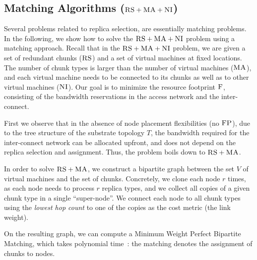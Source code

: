 \documentclass[9pt,twocolumn]{scrartcl}
\newcommand{\Capacity}{\ensuremath{\textsc{cap}}}
\newcommand{\MaFactor}{r}
\newcommand{\ChunkType}{\tau}
\newcommand{\VirtualNodes}{\ensuremath{V}}
\newcommand{\CC}{\textsc{NI}}
\newcommand{\FP}{\textsc{FP}}
\newcommand{\RS}{\textsc{RS}}
\newcommand{\MA}{\textsc{MA}}
\newcommand{\Cost}{\textsc{F}}
\newcommand{\Tree}{\ensuremath{T}}
\newcommand{\CostTrans}{\ensuremath{b_1}}
\newcommand{\CostCom}{\ensuremath{b_2}}
\begin{document}

\subsection{Matching Algorithms ($\RS+\MA+\CC$)}

Several problems related to replica selection,
are essentially matching problems.
In the following, we show how to solve
the $\RS+\MA+\CC$ problem using a matching approach.
Recall that in the $\RS+\MA+\CC$ problem,
we are given a set of redundant chunks ($\RS$) and a set of virtual machines
at fixed locations. The number of chunk types is larger than the number
of virtual machines ($\MA$), and each virtual machine needs to be connected
to its chunks as well as to other virtual machines ($\CC$).
Our goal is to minimize the resource footprint $\Cost$, consisting
of the bandwidth reservations in the access network and the inter-connect.

First we observe that in the absence of node placement flexibilities (no $\FP$),
due to the tree structure of the substrate topology $\Tree$, the bandwidth required
for the inter-connect network can be allocated upfront, and does not depend on the replica
selection and assignment. Thus, the problem boils down to $\RS+\MA$.

In order to solve $\RS+\MA$, we construct a bipartite graph between the set
$\VirtualNodes$ of virtual machines and
the set of chunks.
Concretely, we clone each node $\MaFactor$ times,
as each node needs to process
$\MaFactor$ replica types, and we collect all copies of a given chunk type in a
single %
``super-node''. We connect each node to all chunk types using the
\emph{lowest hop count} to one of the copies as the cost metric (the link weight).

On the resulting graph, we can compute a Minimum Weight
Perfect Bipartite
Matching, which takes polynomial time~\cite{schrijver_combinatorial_optimization}:
the matching denotes the assignment of chunks to nodes.
\end{document}

